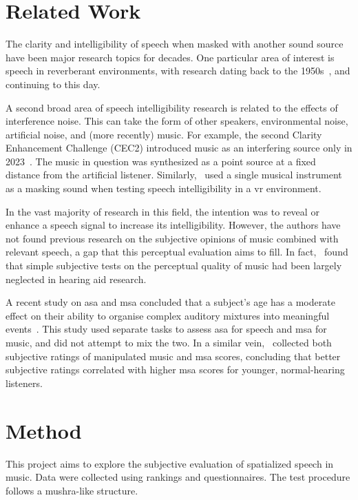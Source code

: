 \documentclass[a4paper,10pt]{edpsci} %
\begin{document}
\section{Related Work}
\label{RelatedWork}
The clarity and intelligibility of speech when masked with another sound source have been major research topics for decades. One particular area of interest is speech in reverberant environments, with research dating back to the 1950s~\cite{muncey1953acceptability}, and continuing to this day.

A second broad area of speech intelligibility research is related to the effects of interference noise. This can take the form of other speakers, environmental noise, artificial noise, and (more recently) music. For example, the second Clarity Enhancement Challenge (CEC2) introduced music as an interfering source only in 2023~\cite{akeroyd_2nd_2023}. The music in question was synthesized as a point source at a fixed distance from the artificial listener. Similarly,~\cite{fichna_perceptual_2022} used a single musical instrument as a masking sound when testing speech intelligibility in a \gls{vr} environment.

In the vast majority of research in this field, the intention was to reveal or enhance a speech signal to increase its intelligibility. However, the authors have not found previous research on the subjective opinions of music combined with relevant speech, a gap that this perceptual evaluation aims to fill. In fact,~\cite{madsen_music_2014} found that simple subjective tests on the perceptual quality of music had been largely neglected in hearing aid research. 

A recent study on \gls{asa} and \gls{msa} concluded that a subject's age has a moderate effect on their ability to organise complex auditory mixtures into meaningful events~\cite{hake_individual_2025}. This study used separate tasks to assess \gls{asa} for speech and \gls{msa} for music, and did not attempt to mix the two. In a similar vein,~\cite{benjamin_evaluating_2024} collected both subjective ratings of manipulated music and \gls{msa} scores, concluding that better subjective ratings correlated with higher \gls{msa} scores for younger, normal-hearing listeners.


\section{Method}\label{Method}

This project aims to explore the subjective evaluation of spatialized speech in music. Data were collected using rankings and questionnaires. The test procedure follows a \acrshort{mushra}-like structure.
\end{document}
